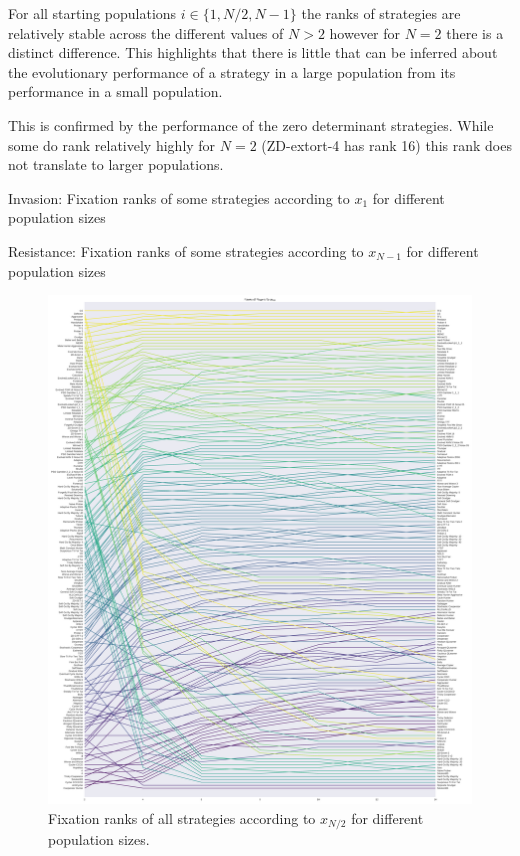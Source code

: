 \documentclass{article}
\begin{document}
For all starting populations
\(i\in\{1, N/2, N-1\}\) the ranks of strategies are relatively stable across the
different values of \(N>2\) however for \(N=2\) there is a distinct difference.
This highlights that there is little that can be inferred about the evolutionary
performance of a strategy in a large population from its performance in a small
population.

This is confirmed by the performance of the zero determinant strategies. While
some do rank relatively highly for \(N=2\) (ZD-extort-4 has rank 16) this rank
does not translate to larger populations.

\begin{table}[!hbtp]
    \centering
    \scriptsize
    
    \caption{Invasion: Fixation ranks of some strategies according to \(x_1\) for different
    population sizes}
    \label{tbl:ranks_v_size_invade}
\end{table}

\begin{table}[!hbtp]
    \centering
    \scriptsize
    
    \caption{Resistance: Fixation ranks of some strategies according to \(x_{N-1}\) for different
    population sizes}
    \label{tbl:ranks_v_size_resist}
\end{table}

\begin{figure}[!hbtp]
    \centering
    \includegraphics[height=.9\textheight]{./img/average_rank_vs_population_size_coexist.pdf}
    \caption{Fixation ranks of all strategies according to \(x_{N/2}\) for different
    population sizes.}
    \label{fig:ranks_v_size_coexist}
\end{figure}
\end{document}
